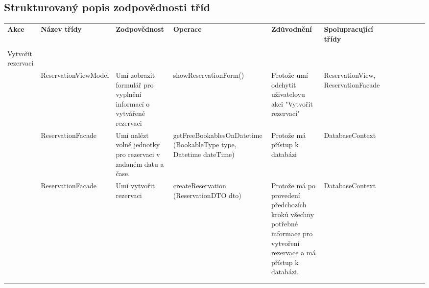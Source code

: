 \newpage
\begin{landscape}
\section*{Strukturovaný popis zodpovědnosti tříd}

\begin{longtable}{ Lp{3cm} | Lp{3.5cm} | Lp{4.5cm} | Lp{4.5cm} | Lp{4cm} | Lp{4cm} }
  	
    \textbf{Akce} & 
      \textbf{Název třídy} & \textbf{Zodpovědnost} & \textbf{Operace} & \textbf{Zdůvodnění} & \textbf{Spolupracující třídy} \\
    
    & & & & & \\
    Vytvořit rezervaci & & & & & \\
    \hline
  
    & ReservationViewModel & Umí zobrazit formulář pro vyplnění informací o vytvářené rezervaci & showReservationForm() & Protože umí odchytit uživatelovu akci "Vytvořit rezervaci" & ReservationView, ReservationFacade \\
    & ReservationFacade & Umí nalézt volné jednotky pro rezervaci v zadaném datu a čase. & getFreeBookablesOnDatetime (BookableType type, Datetime dateTime) & Protože má přístup k databázi & DatabaseContext \\
    & ReservationFacade & Umí vytvořit rezervaci & createReservation (ReservationDTO dto) & Protože má po provedení předchozích kroků všechny potřebné informace pro vytvoření rezervace a má přístup k databázi. & DatabaseContext \\
    
    & & & & & \\
    & & & & & \\
    
    
    
    \hline
\end{longtable}

\end{landscape}
